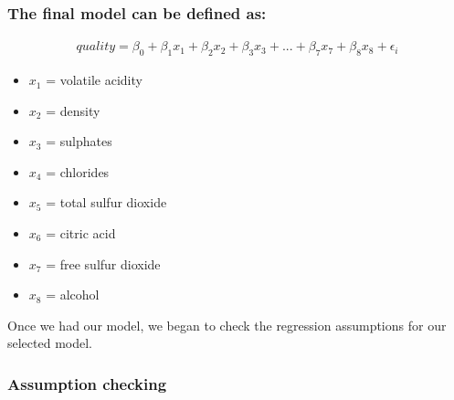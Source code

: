 \documentclass[a4paper,9pt,twocolumn,twoside,]{pinp}
\providecommand{\tightlist}{%
  \setlength{\itemsep}{0pt}\setlength{\parskip}{0pt}}
\begin{document}
\subsubsection{The final model can be defined
as:}\label{the-final-model-can-be-defined-as}

\begin{equation}
  \begin{aligned}
  quality = \beta_{0} + \beta_{1}{x_1} + \beta_{2}{x_2} + \beta_{3}{x_3} + ... + \beta_{7}{x_7} + \beta_{8}{x_8} + \epsilon_i
       \label{eqn:model}
  \end{aligned}
\end{equation}

\begin{itemize}
\tightlist
\item
  \(x_1\) = volatile acidity
\item
  \(x_2\) = density
\item
  \(x_3\) = sulphates
\item
  \(x_4\) = chlorides
\item
  \(x_5\) = total sulfur dioxide
\item
  \(x_6\) = citric acid
\item
  \(x_7\) = free sulfur dioxide
\item
  \(x_8\) = alcohol
\end{itemize}

Once we had our model, we began to check the regression assumptions for
our selected model. \pagebreak

\subsubsection{Assumption checking}\label{assumption-checking}
\end{document}
